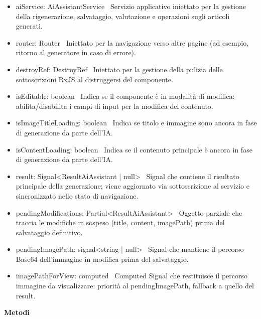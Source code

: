 \documentclass[a4paper,11pt]{article}
\begin{document}
\begin{itemize}[noitemsep, topsep=0pt]
\item aiService: AiAssistantService  \
Servizio applicativo iniettato per la gestione della rigenerazione, salvataggio, valutazione e operazioni sugli articoli generati.

\item router: Router  \
Iniettato per la navigazione verso altre pagine (ad esempio, ritorno al generatore in caso di errore).

\item destroyRef: DestroyRef  \
Iniettato per la gestione della pulizia delle sottoscrizioni RxJS al distruggersi del componente.

\item isEditable: boolean  \
Indica se il componente è in modalità di modifica; abilita/disabilita i campi di input per la modifica del contenuto.

\item isImageTitleLoading: boolean  \
Indica se titolo e immagine sono ancora in fase di generazione da parte dell'IA.

\item isContentLoading: boolean  \
Indica se il contenuto principale è ancora in fase di generazione da parte dell'IA.

\item result: Signal\textless{}ResultAiAssistant | null\textgreater{}  \
Signal che contiene il risultato principale della generazione; viene aggiornato via sottoscrizione al servizio e sincronizzato nello stato di navigazione.

\item pendingModifications: Partial\textless{}ResultAiAssistant\textgreater{}  \
Oggetto parziale che traccia le modifiche in sospeso (title, content, imagePath) prima del salvataggio definitivo.

\item pendingImagePath: signal\textless{}string | null\textgreater{}  \
Signal che mantiene il percorso Base64 dell'immagine in modifica prima del salvataggio.

\item imagePathForView: computed  \
Computed Signal che restituisce il percorso immagine da visualizzare: priorità al pendingImagePath, fallback a quello del result.


\end{itemize}


\textbf{Metodi}
\end{document}
